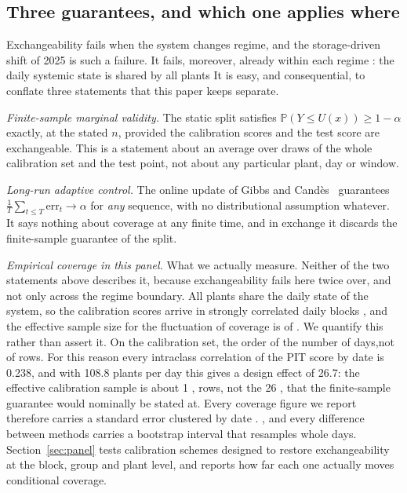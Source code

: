 \documentclass[preprint,3p,times]{elsarticle}
\providecommand{\DIFaddtex}[1]{{\protect\color{blue} \sf #1}} %
\providecommand{\DIFdeltex}[1]{{\protect\color{red} \scriptsize #1}} %
\providecommand{\DIFaddbegin}{} %
\providecommand{\DIFaddend}{} %
\providecommand{\DIFdelbegin}{} %
\providecommand{\DIFdelend}{} %
\providecommand{\DIFadd}[1]{\texorpdfstring{\DIFaddtex{#1}}{#1}} %
\providecommand{\DIFdel}[1]{\texorpdfstring{\DIFdeltex{#1}}{}} %
\begin{document}
\DIFdelbegin %
\DIFdelend \DIFaddbegin \subsection{Three guarantees, and which one applies where}
\label{sec:guarantees}
\DIFaddend 

\DIFdelbegin \DIFdel{Exchangeability fails when the system changes regime, and the storage-driven shift of 2025 is such a failure.
It fails, moreover, already within each regime : the daily systemic state is shared by all plants}\DIFdelend \DIFaddbegin \DIFadd{It is easy, and consequential, to conflate three statements that this paper keeps separate.
}

\DIFadd{\emph{Finite-sample marginal validity.} The static split satisfies $\mathbb{P}(Y\le U(x))\ge 1-\alpha$ exactly, at the stated $n$, provided the calibration scores and the test score are exchangeable. This is a statement about an average over draws of the whole calibration set and the test point, not about any particular plant, day or window.
}

\DIFadd{\emph{Long-run adaptive control.} The online update of Gibbs and Cand\`es~\cite{gibbs2021} guarantees $\frac{1}{T}\sum_{t\le T}\mathrm{err}_t\to\alpha$ for \emph{any} sequence, with no distributional assumption whatever. It says nothing about coverage at any finite time, and in exchange it discards the finite-sample guarantee of the split.
}

\DIFadd{\emph{Empirical coverage in this panel.} What we actually measure. Neither of the two statements above describes it, because exchangeability fails here twice over, and not only across the regime boundary. All plants share the daily state of the system}\DIFaddend , so the calibration scores arrive in strongly correlated daily blocks\DIFdelbegin \DIFdel{, and the effective sample size for the fluctuation of coverage is of }\DIFdelend \DIFaddbegin \DIFadd{. We quantify this rather than assert it. On the calibration set, }\DIFaddend the \DIFdelbegin \DIFdel{order of the number of days,not of rows. For this reason every }\DIFdelend \DIFaddbegin \DIFadd{intraclass correlation of the PIT score by date is 0.238, and with 108.8 plants per day this gives a design effect of 26.7: the effective calibration sample is about 1}{\DIFadd{,}}\DIFadd{000 rows, not the 26}{\DIFadd{,}}\DIFadd{552 that the finite-sample guarantee would nominally be stated at. Every }\DIFaddend coverage figure we report \DIFaddbegin \DIFadd{therefore }\DIFaddend carries a standard error clustered by date\DIFdelbegin \DIFdel{. }\DIFdelend \DIFaddbegin \DIFadd{, and every difference between methods carries a bootstrap interval that resamples whole days. Section~\ref{sec:panel} tests calibration schemes designed to restore exchangeability at the block, group and plant level, and reports how far each one actually moves conditional coverage.
}
\end{document}
